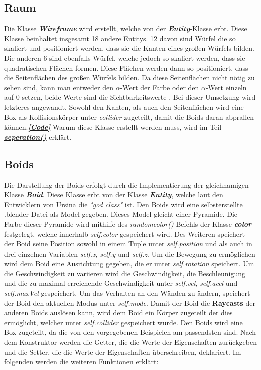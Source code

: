 \documentclass[a4paper, hidelinks, 12pt]{article}
\begin{document}
\subsection{Raum}\label{Wireframe}
Die Klasse \textbf{\emph{Wireframe}} wird erstellt, welche von der \textbf{\emph{Entity}}-Klasse\cite{2022l} erbt. Diese Klasse beinhaltet insgesamt 18 andere Entitys. 12 davon sind Würfel die so skaliert und positioniert werden, dass sie die Kanten eines großen Würfels bilden. Die anderen 6 sind ebenfalls Würfel, welche jedoch so skaliert werden, dass sie quadratischen Flächen formen. Diese Flächen werden dann so positioniert, dass die Seitenflächen des großen Würfels bilden. Da diese Seitenflächen nicht nötig zu sehen sind, kann man entweder den $\alpha$-Wert der Farbe oder den $\alpha$-Wert einzeln auf 0 setzen, beide Werte sind die Sichtbarkeitswerte \cite{2022p}. Bei dieser Umsetzung wird letzteres angewandt. Sowohl den Kanten, als auch den Seitenflächen wird eine Box als Kollisionskörper unter \emph{collider} zugeteilt, damit die Boids daran abprallen können\cite{2022r}.\hyperref[CodeRaum]{\textbf{\emph{[Code]}}} \newline \scriptsize Warum diese Klasse erstellt werden muss, wird im Teil \hyperref[sec:seperation]{\textbf{\emph{seperation()}}} erklärt.
\newpage
\normalsize\subsection{Boids}\label{sec:Boid}
Die Darstellung der Boids erfolgt durch die Implementierung der gleichnamigen Klasse \textbf{\emph{Boid}}. Diese Klasse erbt von der Klasse \textbf{\emph{Entity}}\cite{2022l}, welche laut den Entwicklern von Ursina die \emph{"god class"} ist\cite{godclass}. 
Den Boids wird eine selbsterstellte .blender-Datei als Model gegeben. Dieses Model gleicht einer Pyramide. Die Farbe dieser Pyramide wird mithilfe des \emph{random\textunderscore color()} Befehls der Klasse \textbf{\emph{color}} festgelegt, welche innerhalb \emph{self.color} gespeichert wird\cite{color}. Des Weiteren speichert der Boid seine Position sowohl in einem Tuple unter \emph{self.position} und als auch in drei einzelnen Variablen \emph{self.x}, \emph{self.y} und \emph{self.z}. Um die Bewegung zu ermöglichen wird dem Boid eine Ausrichtung gegeben, die er unter \emph{self.rotation} speichert\cite{2022l}. Um die Geschwindigkeit zu variieren wird die Geschwindigkeit, die Beschleunigung und die zu maximal erreichende Geschwindigkeit unter \emph{self.vel}, \emph{self.acel} und \emph{self.maxVel} gespeichert. Um das Verhalten an den Wänden zu ändern, speichert der Boid den aktuellen Modus unter \emph{self.mode}. Damit der Boid die \textbf{Raycasts} der anderen Boids auslösen kann, wird dem Boid ein Körper zugeteilt der dies ermöglicht, welcher unter \emph{self.collider} gespeichert wurde. Den Boids wird eine Box zugeteilt, da die von den vorgegebenen Beispielen am passendsten sind\cite{2022r}.
Nach dem Konstruktor werden die Getter, die die Werte der Eigenschaften zurückgeben und die Setter, die die Werte der Eigenschaften überschreiben, deklariert.
Im folgenden werden die weiteren Funktionen erklärt:\newline
	
\end{document}
